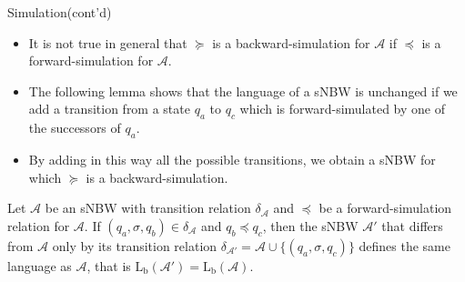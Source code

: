 \documentclass[12pt]{beamer}
\begin{document}

\begin{frame}{Simulation(cont'd)}
	\label{lemma}
	\begin{itemize}
		\item It is not true in general that $\succeq$ is a backward-simulation for $\mathcal{A}$ if $\preceq$ is a forward-simulation for $\mathcal{A}$.
		\item The following lemma shows that the language of a sNBW is unchanged if we add a transition from a state $q_{a}$ to $q_{c}$ which is forward-simulated by one of the successors of $q_{a}$.
		\item By adding in this way all the possible transitions, we
		obtain a sNBW for which $\succeq$ is a backward-simulation.
	\end{itemize}
	\begin{lemma}
		Let $\mathcal{A}$ be an sNBW with transition relation $\delta_{\mathcal{A}}$ and $\preceq$ be a forward-simulation relation for $\mathcal{A}$. If $(q_{a}, \sigma, q_{b}) \in \delta_{\mathcal{A}}$ and $q_{b} \preceq q_{c}$, then the sNBW $\mathcal{A}'$ that differs from $\mathcal{A}$ only by its transition relation $\delta_{\mathcal{A}'} = \mathcal{A} \cup \{(q_{a}, \sigma, q_{c})\}$ defines the same language as $\mathcal{A}$, that is $\text{L}_\text{b}(\mathcal{A}') = \text{L}_\text{b}(\mathcal{A})$.
	\end{lemma}
\end{frame}
\end{document}
